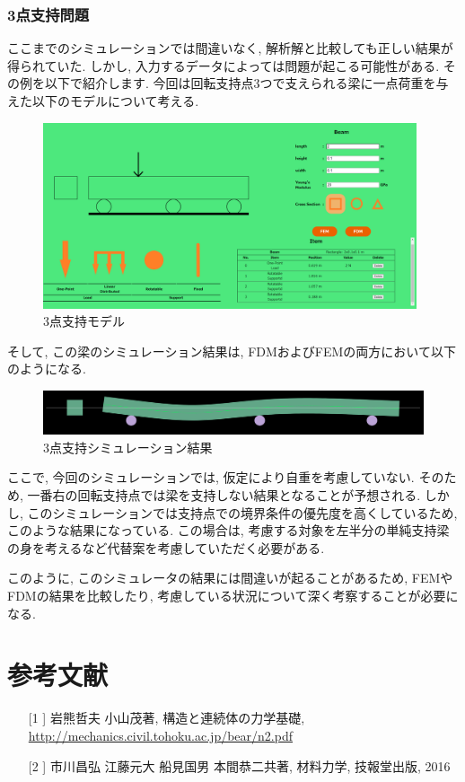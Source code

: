 \documentclass{jsarticle}
\begin{document}
\newpage

\section{3点支持問題}
ここまでのシミュレーションでは間違いなく, 解析解と比較しても正しい結果が得られていた. しかし, 入力するデータによっては問題が起こる可能性がある. その例を以下で紹介します. 今回は回転支持点3つで支えられる梁に一点荷重を与えた以下のモデルについて考える. 

\begin{figure}[H]
\begin{center}
\includegraphics[width=11cm]{three_model.PNG}
\caption{3点支持モデル}
\end{center}
\end{figure}

そして, この梁のシミュレーション結果は, FDMおよびFEMの両方において以下のようになる.

\begin{figure}[H]
\begin{center}
\includegraphics[width=13cm]{three_model_result.PNG}
\caption{3点支持シミュレーション結果}
\end{center}
\end{figure}

ここで, 今回のシミュレーションでは, 仮定により自重を考慮していない. そのため, 一番右の回転支持点では梁を支持しない結果となることが予想される. しかし, このシミュレーションでは支持点での境界条件の優先度を高くしているため, このような結果になっている. この場合は, 考慮する対象を左半分の単純支持梁の身を考えるなど代替案を考慮していただく必要がある.

このように, このシミュレータの結果には間違いが起ることがあるため, FEMやFDMの結果を比較したり, 考慮している状況について深く考察することが必要になる.


\newpage
\part{参考文献}
\begin{itemize}
\item[[1]] 岩熊哲夫 小山茂著, 構造と連続体の力学基礎, \url{http://mechanics.civil.tohoku.ac.jp/bear/n2.pdf}
\item[[2]] 市川昌弘 江藤元大 船見国男 本間恭二共著, 材料力学, 技報堂出版, 2016
\end{itemize}
\end{document}
